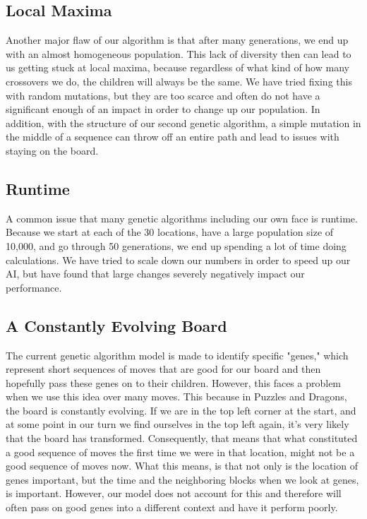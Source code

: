 \documentclass[journal,final,letterpaper,11pt]{IEEEtran}
\begin{document}
\subsection{Local Maxima}
Another major flaw of our algorithm is that after many generations, we end up with an almost homogeneous population. This lack of diversity then can lead to us getting stuck at local maxima, because regardless of what kind of how many crossovers we do, the children will always be the same. We have tried fixing this with random mutations, but they are too scarce and often do not have a significant enough of an impact in order to change up our population. In addition, with the structure of our second genetic algorithm, a simple mutation in the middle of a sequence can throw off an entire path and lead to issues with staying on the board.

\subsection{Runtime}
A common issue that many genetic algorithms including our own face is runtime. Because we start at each of the 30 locations, have a large population size of 10,000, and go through 50 generations, we end up spending a lot of time doing calculations. We have tried to scale down our numbers in order to speed up our AI, but have found that large changes severely negatively impact our performance.

\subsection{A Constantly Evolving Board}
The current genetic algorithm model is made to identify specific "genes," which represent short sequences of moves that are good for our board and then hopefully pass these genes on to their children. However, this faces a problem when we use this idea over many moves. This because in Puzzles and Dragons, the board is constantly evolving. If we are in the top left corner at the start, and at some point in our turn we find ourselves in the top left again, it's very likely that the board has transformed. Consequently, that means that what constituted a good sequence of moves the first time we were in that location, might not be a good sequence of moves now. What this means, is that not only is the location of genes important, but the time and the neighboring blocks when we look at genes, is important. However, our model does not account for this and therefore will often pass on good genes into a different context and have it perform poorly.
\end{document}

